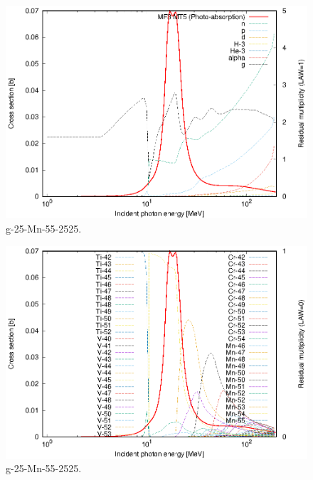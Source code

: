 \begin{figure}
 \includegraphics[width=\linewidth]{eps/g_25-Mn-55_2525.eps}
  \caption{g-25-Mn-55-2525.}
\end{figure}
\begin{figure}
 \includegraphics[width=\linewidth]{eps-law0/g_25-Mn-55_2525.eps}
 \caption{g-25-Mn-55-2525.}
\end{figure}
\newpage \clearpage

